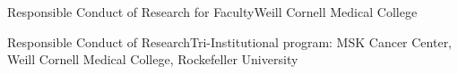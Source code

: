 \documentclass[11pt,a4paper,roman]{moderncv} %
\begin{document}
        {Responsible Conduct of Research for Faculty}{}{}{}{Weill Cornell Medical College}

        {Responsible Conduct of Research}{}{}{}{Tri-Institutional program: MSK Cancer Center, Weill Cornell Medical College, Rockefeller University}





\end{document}
